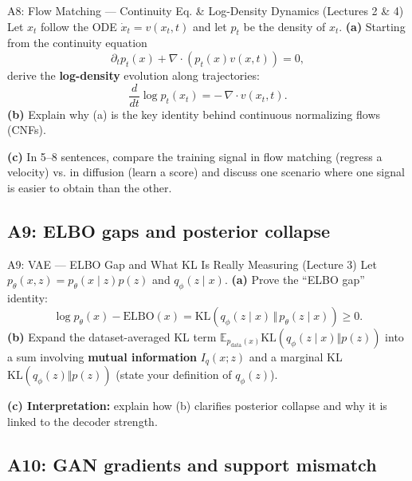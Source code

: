 \documentclass[aspectratio=169]{beamer}
\begin{document}
\begin{frame}{A8: Flow Matching --- Continuity Eq. \& Log-Density Dynamics (Lectures 2 \& 4)}
\small
Let $x_t$ follow the ODE $\dot x_t=v(x_t,t)$ and let $p_t$ be the density of $x_t$.
\textbf{(a)} Starting from the continuity equation
\[
\partial_t p_t(x)+\nabla\cdot(p_t(x)v(x,t))=0,
\]
derive the \textbf{log-density} evolution along trajectories:
\[
\frac{d}{dt}\log p_t(x_t) = -\,\nabla\cdot v(x_t,t).
\]
\textbf{(b)} Explain why (a) is the key identity behind continuous normalizing flows (CNFs).
\vspace{0.3em}

\textbf{(c)} In 5--8 sentences, compare the training signal in flow matching (regress a velocity) vs. in diffusion (learn a score) and discuss one scenario where one signal is easier to obtain than the other.
\end{frame}

\subsection{A9: ELBO gaps and posterior collapse}

\begin{frame}{A9: VAE --- ELBO Gap and What KL Is Really Measuring (Lecture 3)}
\small
Let $p_\theta(x,z)=p_\theta(x\mid z)p(z)$ and $q_\phi(z\mid x)$.
\textbf{(a)} Prove the ``ELBO gap'' identity:
\[
\log p_\theta(x)-\mathrm{ELBO}(x)
=\mathrm{KL}\!\left(q_\phi(z\mid x)\,\Vert\,p_\theta(z\mid x)\right)\ge 0.
\]
\textbf{(b)} Expand the dataset-averaged KL term
$\mathbb{E}_{p_{\text{data}}(x)}\mathrm{KL}(q_\phi(z\mid x)\Vert p(z))$
into a sum involving \textbf{mutual information} $I_q(x;z)$ and a marginal KL $\mathrm{KL}(q_\phi(z)\Vert p(z))$ (state your definition of $q_\phi(z)$).
\vspace{0.3em}

\textbf{(c) Interpretation:} explain how (b) clarifies posterior collapse and why it is linked to the decoder strength.
\end{frame}

\subsection{A10: GAN gradients and support mismatch}
\end{document}
